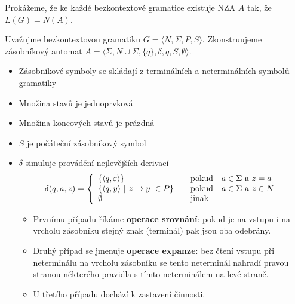 \documentclass[10pt, a4paper, titlepage]{article}
\theoremstyle{note}
\begin{document}
Prokážeme, že ke každé bezkontextové gramatice existuje NZA $A$ tak, že $L(G)=N(A)$.

Uvažujme bezkontextovou gramatiku $G = \langle N,\Sigma,P,S \rangle$. Zkonstruujeme zásobníkový automat $A = \langle \Sigma,N \cup \Sigma,\lbrace q \rbrace,\delta,q,S,\emptyset \rangle$.

\begin{itemize}
\item
Zásobníkové symboly se skládají z terminálních a neterminálních symbolů gramatiky
\item
Množina stavů je jednoprvková
\item
Množina koncových stavů je prázdná
\item
$S$ je počáteční zásobníkový symbol
\item
$\delta$ simuluje provádění nejlevějších derivací
$$
\delta(q,a,z)=\left\{
\begin{array}{l@{\quad\mbox{}\quad}l}
\lbrace \langle q, \varepsilon \rangle \rbrace & \text{pokud}\quad a \in \Sigma\ \text{a}\ z=a\\
\lbrace \langle q,y \rangle\ |\ z\rightarrow y\ \in P \rbrace & \text{pokud}\quad a \in \Sigma\ \text{a}\ z \in N\\
\emptyset & \text{jinak}
\end{array}
\right.
$$

\begin{itemize}
\item
Prvnímu případu říkáme \textbf{operace srovnání}: pokud je na vstupu i na vrcholu zásobníku stejný znak (terminál) pak jsou oba odebrány.
\item
Druhý případ se jmenuje \textbf{operace expanze}: bez čtení vstupu při neterminálu na vrcholu zásobníku se tento neterminál nahradí pravou stranou některého pravidla s tímto neterminálem na levé straně.
\item
U třetího případu dochází k zastavení činnosti.
\end{itemize}
\end{itemize}
\end{document}
